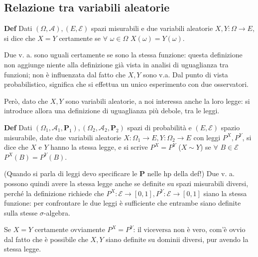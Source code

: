 \documentclass{article}
\begin{document}
\subsection{Relazione tra variabili aleatorie}

\textbf{Def} Dati $\left( \Omega ,\mathcal{A}\right) ,\left( E,\mathcal{E}%
\right) $ spazi misurabili e due variabili aleatorie $X,Y:\Omega \rightarrow
E$, si dice che $X=Y$ certamente se $\forall $ $\omega \in \Omega $ $X\left(
\omega \right) =Y\left( \omega \right) $.

Due v. a. sono uguali certamente se sono la stessa funzione: questa
definizione non aggiunge niente alla definizione gi\`{a} vista in analisi di
uguaglianza tra funzioni; non \`{e} influenzata dal fatto che $X,Y$ sono
v.a. Dal punto di vista probabilistico, significa che si effettua un unico
esperimento con due osservatori.

Per\`{o}, dato che $X,Y$ sono variabili aleatorie, a noi interessa anche la
loro legge: si introduce allora una definizione di uguaglianza pi\`{u}
debole, tra le leggi.

\textbf{Def} Dati $\left( \Omega _{1},\mathcal{A}_{1},\mathbf{P}_{1}\right)
,\left( \Omega _{2},\mathcal{A}_{2},\mathbf{P}_{2}\right) $ spazi di
probabilit\`{a} e $\left( E,\mathcal{E}\right) $ spazio misurabile, date due
variabili aleatorie $X:\Omega _{1}\rightarrow E,Y:\Omega _{2}\rightarrow E$
con leggi $P^{X},P^{Y}$, si dice che $X$ e $Y$ hanno la stessa legge, e si
scrive $P^{X}=P^{Y}$ ($X\sim Y$) se $\forall $ $B\in \mathcal{E}$ $%
P^{X}\left( B\right) =P^{Y}\left( B\right) $.

(Quando si parla di leggi devo specificare le $\mathbf{P}$ nelle hp della
def!) Due v. a. possono quindi avere la stessa legge anche se definite su
spazi misurabili diversi, perch\'{e} la definizione richiede che $P^{X}:%
\mathcal{E}\rightarrow \left[ 0,1\right] ,P^{Y}:\mathcal{E\rightarrow }\left[
0,1\right] $ siano la stessa funzione: per confrontare le due leggi \`{e}
sufficiente che entrambe siano definite sulla stesse $\sigma $-algebra.

Se $X=Y$ certamente ovviamente $P^{X}=P^{Y}$: il viceversa non \`{e} vero,
com'\`{e} ovvio dal fatto che \`{e} possibile che $X,Y$ siano definite su
dominii diversi, pur avendo la stessa legge.
\end{document}
